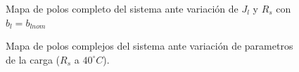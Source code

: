 \documentclass[a4paper, 10pt, onecolumn,journal]{ieeeconf}
\begin{document}
\begin{figure}[thpb]
	\centering
	\begin{adjustbox}{max width=\columnwidth}
	\end{adjustbox}
	\caption{Mapa de polos completo del sistema ante variación de $J_l$ y $R_s$ con $b_l = b_{lnom}$}
	\label{mapa de polos b_l nominal}
\end{figure}

\begin{figure}[thpb]
	\centering
	\begin{adjustbox}{max width=\columnwidth}
	\end{adjustbox}
	\caption{Mapa de polos complejos del sistema ante variación de parametros de la carga ($R_s$ a $40^\circ C$).}
	\label{mapa de polos complejos}
\end{figure}
\end{document}

